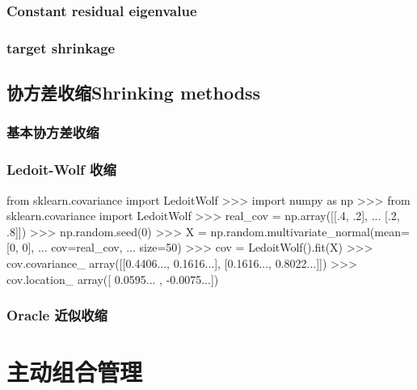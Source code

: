 \documentclass{scrartcl}
\numberwithin{equation}{section}   %
\begin{document}
\subsubsection{Constant residual eigenvalue}
\subsubsection{target shrinkage}
\subsection{协方差收缩Shrinking methodss}
\subsubsection{基本协方差收缩}
\subsubsection{Ledoit-Wolf 收缩}
\begin{python}
    from sklearn.covariance import LedoitWolf
    >>> import numpy as np
    >>> from sklearn.covariance import LedoitWolf
    >>> real_cov = np.array([[.4, .2],
            ...                      [.2, .8]])
    >>> np.random.seed(0)
    >>> X = np.random.multivariate_normal(mean=[0, 0],
    ...                                   cov=real_cov,
    ...                                   size=50)
    >>> cov = LedoitWolf().fit(X)
    >>> cov.covariance_
    array([[0.4406..., 0.1616...],
            [0.1616..., 0.8022...]])
    >>> cov.location_
    array([ 0.0595... , -0.0075...])
\end{python}
\subsubsection{Oracle 近似收缩}
\newpage

\section{主动组合管理}
\end{document}
